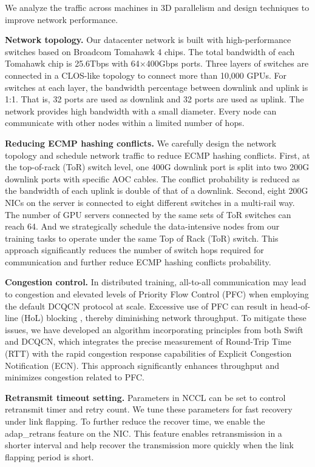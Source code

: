 \documentclass[letterpaper,twocolumn,10pt]{article}
\newcommand{\parabf}[1]{\medskip\noindent\textbf{#1}}
\newcommand{\revision}[1]{{#1}}
\begin{document}
We analyze the traffic across machines in 3D parallelism and design techniques to improve network performance.

\parabf{Network topology.} Our datacenter network is built with high-performance
switches based on Broadcom Tomahawk 4 chips. The total bandwidth of each Tomahawk
chip is 25.6Tbps with 64$\times$400Gbps ports. Three layers of switches are
connected in a CLOS-like topology to connect more than 10,000 GPUs. For switches
at each layer, the bandwidth percentage between downlink and uplink is 1:1. That
is, 32 ports are used as downlink and 32 ports are used as uplink. The network
provides high bandwidth with a small diameter. Every node can communicate with
other nodes within a limited number of hops.   

\parabf{Reducing ECMP hashing conflicts.}
We carefully design the network topology and schedule network traffic to reduce ECMP hashing conflicts. First, at the
top-of-rack (ToR) switch level, one 400G downlink port is split into two 200G
downlink ports with specific AOC cables. The conflict
probability is reduced as the bandwidth of each uplink is double of that
of a downlink. Second, eight 200G NICs on the server
is connected to eight different switches in a multi-rail way. The number of GPU
servers connected by the same sets of ToR switches can reach 64. And we strategically schedule the data-intensive nodes from our training tasks to operate under the same Top of Rack (ToR) switch. This approach significantly reduces the number of switch hops required for communication and further reduce ECMP hashing conflicts probability.

\parabf{Congestion control.} \revision{In distributed training, all-to-all communication may lead to congestion and elevated levels of Priority Flow Control (PFC)\cite{PFCStandard} when employing the default DCQCN\cite{zhu2015congestion} protocol at scale. Excessive use of PFC can result in head-of-line (HoL) blocking \cite{zhu2015congestion}, thereby diminishing network throughput. To mitigate these issues, we have developed an algorithm incorporating principles from both Swift\cite{kumar2020swift} and DCQCN, which integrates the precise measurement of Round-Trip Time (RTT) with the rapid congestion response capabilities of Explicit Congestion Notification (ECN). This approach significantly enhances throughput and minimizes congestion related to PFC.}

\parabf{Retransmit timeout setting.} Parameters in NCCL can be set to control
retransmit timer and retry count. We tune these parameters for fast recovery under link
flapping.
To further reduce the recover time, we enable the adap\_retrans
feature on the NIC. This feature enables retransmission in a shorter interval
and help recover the transmission more quickly when the link flapping period is short.
\end{document}

